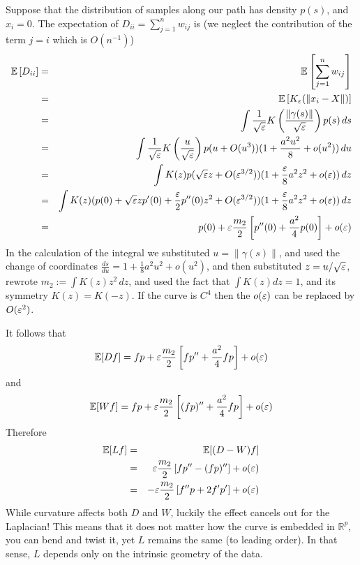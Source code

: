 Suppose that the distribution of samples along our path has density $p(s)$, and $x_i=0$. The expectation of $D_{ii} = \sum_{j=1}^n w_{ij}$ is (we neglect the contribution of the term $j=i$ which is $O(n^{-1})$) 
\begin{eqnarray*}
\mathbb{E}\left[D_{ii}\right] &=& \mathbb{E}\left[\sum_{j=1}^n w_{ij}\right] \\
&=& \mathbb{E}\left[K_\varepsilon(\|x_i-X\|)\right] \\
&=& \int \frac{1}{\sqrt{\varepsilon}} K\left(\frac{\|\gamma(s)\|}{\sqrt{\varepsilon}} \right)p(s)\,ds\\
 &=& \int \frac{1}{\sqrt{\varepsilon}} K\left(\frac{u}{\sqrt{\varepsilon}}\right)p(u+O(u^3))(1+\frac{a^2u^2}{8} + o(u^2))\,du  \\
&=& \int K(z) p(\sqrt{\varepsilon}z + O(\varepsilon^{3/2}))(1+\frac{\varepsilon}{8}a^2z^2+o(\varepsilon))\, dz\\
&=& \int K(z) ( p(0)+\sqrt{\varepsilon}zp^\prime (0) + \frac{\varepsilon}{2}p^{\prime \prime}(0)z^2 + O(\varepsilon^{3/2})   )(1+\frac{\varepsilon}{8}a^2z^2+o(\varepsilon))\, dz \nonumber \\
&=& p(0) + \varepsilon \frac{m_2}{2}\left[p^{\prime \prime}(0) + \frac{a^2}{4}p(0) \right] + o(\varepsilon)
\end{eqnarray*}
In the calculation of the integral we substituted $u =\|\gamma(s)\|$, and used the change of coordinates $\frac{ds}{du} = 1 + \frac{1}{8}a^2u^2+ o(u^2)$, and then
substituted $z = u/\sqrt{\varepsilon}$, rewrote $m_2 := \int K(z)z^2\,dz$, and used the fact that $\int K(z)dz=1$, and its symmetry $K(z)=K(-z)$. If the curve is $C^4$ then the $o(\varepsilon)$ can be replaced by $O(\varepsilon^2)$.

It follows that
$$\mathbb{E}[Df] = fp + \varepsilon \frac{m_2}{2}\left[fp'' + \frac{a^2}{4}fp \right] + o(\varepsilon)$$
and
$$\mathbb{E}[Wf] = fp + \varepsilon \frac{m_2}{2}\left[(fp)'' + \frac{a^2}{4}fp \right] + o(\varepsilon)$$
Therefore
\begin{eqnarray*}
\mathbb{E}[Lf] &=& \mathbb{E}[(D-W)f] \\
&=&  \varepsilon \frac{m_2}{2}\left[fp^{\prime \prime} - (fp)''  \right] + o(\varepsilon) \\
&=& -\varepsilon \frac{m_2}{2}\left[f''p + 2f'p'   \right] + o(\varepsilon)
\end{eqnarray*}
While curvature affects both $D$ and $W$, luckily the effect cancels out for the Laplacian! This means that it does not matter how the curve is embedded in $\mathbb{R}^p$, you can bend and twist it, yet $L$ remains the same (to leading order). In that sense, $L$ depends only on the intrinsic geometry of the data.

